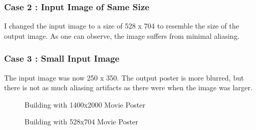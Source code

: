 \documentclass{article}
\newif\ifblackandwhitecycle
\gdef\patternnumber{0}
\gdef\patternnumber{1}
\gdef\patternnumber{1}
\gdef\patternnumber{0}
\gdef\columncount{1}
\gdef\rowcount{1}
\newcommand\zoombox[2][]{
    \begin{scope}[zoombox paths]
        \pgfmathsetmacro\xpos{
            (\columncount-1)*(\imagewidth / \pgfkeysvalueof{/tikz/zoomboxarray columns} + \pgfkeysvalueof{/tikz/zoomboxarray inner gap} / \pgfkeysvalueof{/tikz/zoomboxarray columns} ) + \pgflinewidth
        }
        \pgfmathsetmacro\ypos{
            (\rowcount-1)*( \imageheight / \pgfkeysvalueof{/tikz/zoomboxarray rows} + \pgfkeysvalueof{/tikz/zoomboxarray inner gap} / \pgfkeysvalueof{/tikz/zoomboxarray rows} ) + 0.5*\pgflinewidth
        }
        \edef\dospy{\noexpand\spy [
            #1,
            zoombox paths/.append style={
                black and white pattern=\patternnumber
            },
            every spy on node/.append style={#1},
            x=\imagewidth,
            y=\imageheight
        ] on (#2) in node [anchor=north west] at ($(zoomboxes container.north west)+(\xpos pt,-\ypos pt)$);}
        \dospy
        \pgfmathtruncatemacro\pgfmathresult{ifthenelse(\columncount==\pgfkeysvalueof{/tikz/zoomboxarray columns},\rowcount+1,\rowcount)}
        \global\let\rowcount=\pgfmathresult
        \pgfmathtruncatemacro\pgfmathresult{ifthenelse(\columncount==\pgfkeysvalueof{/tikz/zoomboxarray columns},1,\columncount+1)}
        \global\let\columncount=\pgfmathresult
        \ifblackandwhitecycle
            \pgfmathtruncatemacro{\newpatternnumber}{\patternnumber+1}
            \global\edef\patternnumber{\newpatternnumber}
        \fi
    \end{scope}
}
\begin{document}
\subsubsection{Case 2 : Input Image of Same Size}
I changed the input image to a size of 528 x 704 to resemble the size of the output image.
As one can observe, the image suffers from minimal aliasing. 

\subsubsection{Case 3 : Small Input Image}
The input image was now 250 x 350. The output poster is more blurred, but there is not as much aliasing 
artifacts as there were when the image was larger.

\begin{figure}[H]\centering
    \caption{Building with 1400x2000 Movie Poster}
    \end{figure}
\begin{figure}[H]\centering
    \caption{Building with 528x704 Movie Poster}
    \end{figure}    
\end{document}
